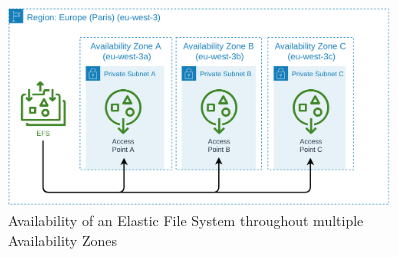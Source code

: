 \begin{figure}[!htbp]
    \centering
    \includegraphics[width=0.90\textwidth]{img/diagrams/pdf/final-arch-efs.drawio.pdf}
    \caption[Elastic File System]{Availability of an Elastic File System throughout multiple Availability Zones}
    \label{fig:final-arch-efs}
\end{figure}
